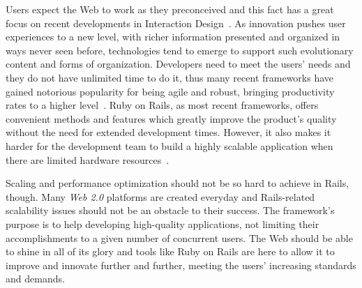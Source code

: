 Users expect the Web to work as they preconceived and this fact has a great focus on recent developments in Interaction Design~\cite{interaction_design}. As innovation pushes user experiences to a new level, with richer information presented and organized in ways never seen before, technologies tend to emerge to support such evolutionary content and forms of organization. Developers need to meet the users' needs and they do not have unlimited time to do it, thus many recent frameworks have gained notorious popularity for being agile and robust, bringing productivity rates to a higher level~\cite{trends_webdev}. Ruby on Rails, as most recent frameworks, offers convenient methods and features which greatly improve the product's quality without the need for extended development times. However, it also makes it harder for the development team to build a highly scalable application when there are limited hardware resources~\cite{look_common_performance_problems_rails}.

Scaling and performance optimization should not be so hard to achieve in Rails, though. Many \textit{Web 2.0} platforms are created everyday and Rails-related scalability issues should not be an obstacle to their success. The framework's purpose is to help developing high-quality applications, not limiting their accomplishments to a given number of concurrent users. The Web should be able to shine in all of its glory and tools like Ruby on Rails are here to allow it to improve and innovate further and further, meeting the users' increasing standards and demands.

